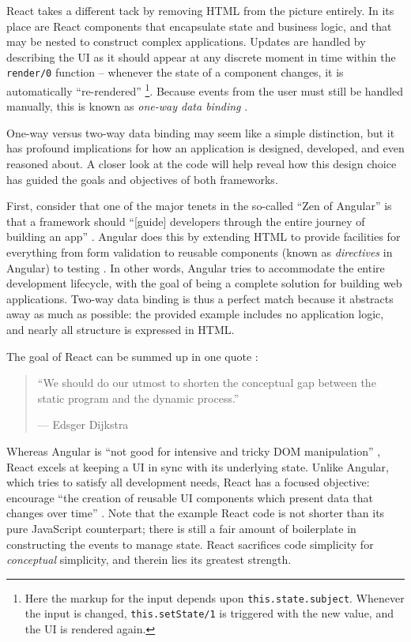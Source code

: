 \documentclass[12pt,letterpaper]{article}
\begin{document}
React takes a different tack by removing HTML from the picture entirely. In its place are React components that encapsulate state and business logic, and that may be nested to construct complex applications. Updates are handled by describing the UI as it should appear at any discrete moment in time within the \texttt{render/0} function -- whenever the state of a component changes, it is automatically ``re-rendered'' \footnote{Here the markup for the input depends upon \texttt{this.state.subject}. Whenever the input is changed, \texttt{this.setState/1} is triggered with the new value, and the UI is rendered again.}. Because events from the user must still be handled manually, this is known as \emph{one-way data binding} \cite{Hunt:2014}.

One-way versus two-way data binding may seem like a simple distinction, but it has profound implications for how an application is designed, developed, and even reasoned about. A closer look at the code will help reveal how this design choice has guided the goals and objectives of both frameworks.

First, consider that one of the major tenets in the so-called ``Zen of Angular'' is that a framework should ``[guide] developers through the entire journey of building an app'' \cite[p.~1]{Angular:Docs}. Angular does this by extending HTML to provide facilities for everything from form validation to reusable components (known as \emph{directives} in Angular) to testing \cite{Green:2013}. In other words, Angular tries to accommodate the entire development lifecycle, with the goal of being a complete solution for building web applications. Two-way data binding is thus a perfect match because it abstracts away as much as possible: the provided example includes no application logic, and nearly all structure is expressed in HTML.

The goal of React can be summed up in one quote \cite{Hunt:2014}:

\begin{quote}
	\singlespacing
	``We should do our utmost to shorten the conceptual gap between the static program and the dynamic process.''

	\raggedleft --- Edsger Dijkstra
\end{quote}

\noindent Whereas Angular is ``not good for intensive and tricky DOM manipulation'' \cite[p.~2]{Angular:Docs}, React excels at keeping a UI in sync with its underlying state. Unlike Angular, which tries to satisfy all development needs, React has a focused objective: encourage ``the creation of reusable UI components which present data that changes over time'' \cite[p.~1]{Hunt:2013}. Note that the example React code is not shorter than its pure JavaScript counterpart; there is still a fair amount of boilerplate in constructing the events to manage state. React sacrifices code simplicity for \emph{conceptual} simplicity, and therein lies its greatest strength.
\end{document}
